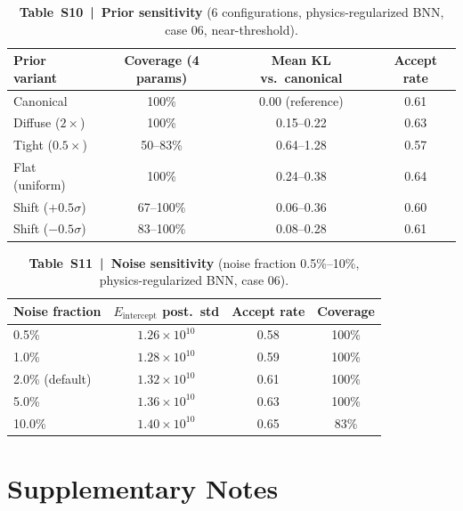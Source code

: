 \documentclass[11pt,a4paper]{article}
\newcommand{\Eint}{\ensuremath{E_{\mathrm{intercept}}}}
\begin{document}
\begin{table}[htbp]
\centering
\caption{\textbf{Table~S10~|~Prior sensitivity} (6 configurations,
physics-regularized BNN, case 06, near-threshold).}
\label{tab:S10}
\smallskip
\small
\begin{tabular}{lccc}
\toprule
Prior variant & Coverage (4 params) & Mean KL vs.\ canonical & Accept rate \\
\midrule
Canonical         & 100\%      & 0.00 (reference) & 0.61 \\
Diffuse ($2\times$)  & 100\%   & 0.15--0.22       & 0.63 \\
Tight ($0.5\times$)  & 50--83\% & 0.64--1.28      & 0.57 \\
Flat (uniform)    & 100\%      & 0.24--0.38       & 0.64 \\
Shift ($+0.5\sigma$) & 67--100\% & 0.06--0.36    & 0.60 \\
Shift ($-0.5\sigma$) & 83--100\% & 0.08--0.28    & 0.61 \\
\bottomrule
\end{tabular}
\end{table}

\begin{table}[htbp]
\centering
\caption{\textbf{Table~S11~|~Noise sensitivity} (noise fraction
0.5\%--10\%, physics-regularized BNN, case 06).}
\label{tab:S11}
\smallskip
\small
\begin{tabular}{lccc}
\toprule
Noise fraction & \Eint{} post.\ std & Accept rate & Coverage \\
\midrule
0.5\%            & $1.26\times10^{10}$ & 0.58 & 100\% \\
1.0\%            & $1.28\times10^{10}$ & 0.59 & 100\% \\
2.0\% (default)  & $1.32\times10^{10}$ & 0.61 & 100\% \\
5.0\%            & $1.36\times10^{10}$ & 0.63 & 100\% \\
10.0\%           & $1.40\times10^{10}$ & 0.65 &  83\% \\
\bottomrule
\end{tabular}
\end{table}


\clearpage

\section{Supplementary Notes}
\label{sec:notes}
\end{document}
